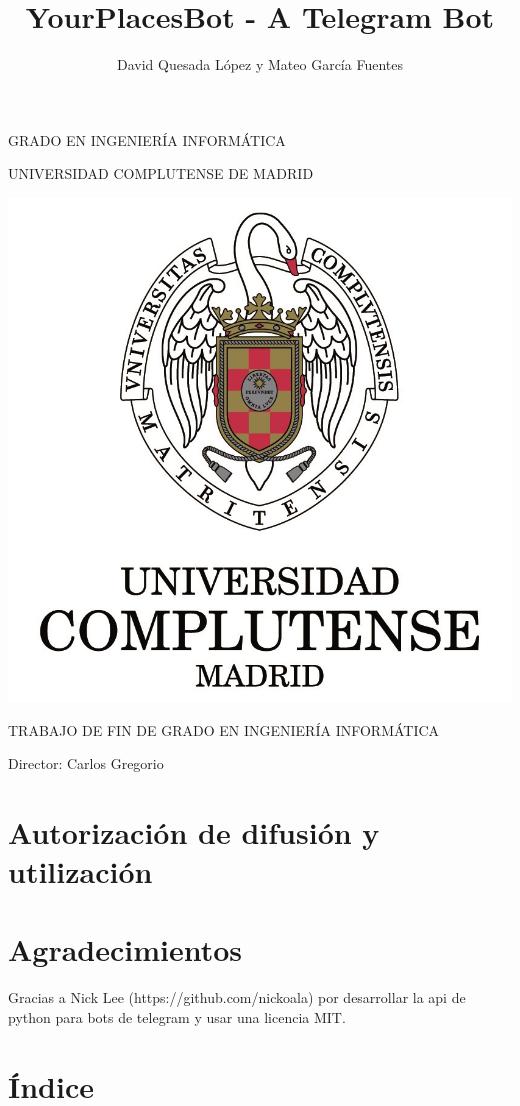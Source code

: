 \documentclass{article}
\title{YourPlacesBot - A Telegram Bot}
\author{David Quesada L\'opez y Mateo Garc\'ia Fuentes}
\begin{document}
\maketitle
\centering

GRADO EN INGENIER\'IA INFORM\'ATICA %

UNIVERSIDAD COMPLUTENSE DE MADRID

\includegraphics{logo.jpg}


TRABAJO DE FIN DE GRADO EN INGENIER\'IA INFORM\'ATICA


Director: Carlos Gregorio

\raggedright

\newpage
\section{Autorizaci\'on de difusi\'on y utilizaci\'on}

\newpage
\section{Agradecimientos}
Gracias a Nick Lee (https://github.com/nickoala) por desarrollar la api de python para bots de telegram y usar una licencia MIT.

\newpage
\section{\'Indice}
\tableofcontents
\end{document}
